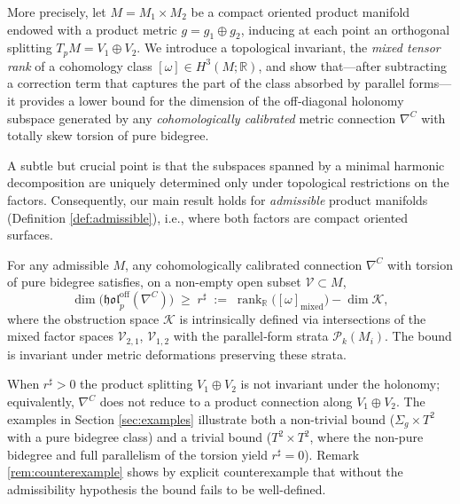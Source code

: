 \documentclass[11pt,reqno]{amsart}
\theoremstyle{plain}
\theoremstyle{definition}
\numberwithin{equation}{section}
\begin{document}
More precisely, let \(M=M_1\times M_2\) be a compact oriented product manifold endowed with a product metric \(g=g_1\oplus g_2\), inducing at each point an orthogonal splitting \(T_pM=V_1\oplus V_2\).  
We introduce a topological invariant, the \emph{mixed tensor rank} of a cohomology class 
\([\omega]\in H^3(M;\mathbb{R})\), and show that—after subtracting a correction term that captures the part of the class absorbed by parallel forms—it provides a lower bound for the dimension of the off‑diagonal holonomy subspace generated by any \emph{cohomologically calibrated} metric connection \(\nabla^{C}\) with totally skew torsion of pure bidegree.

A subtle but crucial point is that the subspaces spanned by a minimal harmonic decomposition 
are uniquely determined only under topological restrictions on the factors.  Consequently, our 
main result holds for \emph{admissible} product manifolds (Definition \ref{def:admissible}), i.e., where both factors are compact oriented surfaces.

For any admissible $M$, any cohomologically calibrated connection $\nabla^C$ with torsion of pure bidegree satisfies, on a non-empty open subset $\mathcal{V} \subset M$,
\[
\dim\bigl(\mathfrak{hol}_p^{\mathrm{off}}(\nabla^{C})\bigr)\;\geq\;
r^\sharp\;:=\;\operatorname{rank}_{\mathbb{R}}\bigl([\omega]_{\mathrm{mixed}}\bigr)-\dim\mathcal{K},
\]
where the obstruction space $\mathcal{K}$ is intrinsically defined via intersections of the mixed 
factor spaces $\mathcal{V}_{2,1}$, $\mathcal{V}_{1,2}$ with the parallel‑form strata 
$\mathcal{P}_k(M_i)$.  The bound is invariant under metric deformations preserving these strata.

When $r^\sharp>0$ the product splitting $V_1\oplus V_2$ is not invariant under the holonomy; equivalently, $\nabla^C$ does not reduce to a product connection along $V_1\oplus V_2$. The examples in Section \ref{sec:examples} illustrate both a non-trivial bound ($\Sigma_g\times T^2$ with a pure bidegree class) and a trivial bound ($T^2\times T^2$, where the non-pure bidegree and full parallelism of the torsion yield $r^\sharp=0$). Remark \ref{rem:counterexample} shows by explicit counterexample that without the admissibility hypothesis the bound fails to be well-defined.
\end{document}
